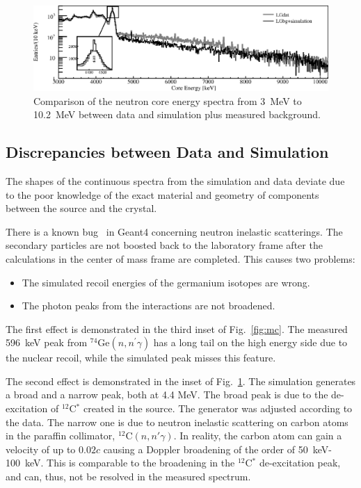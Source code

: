 \documentclass{elsart}
\begin{document}
\begin{figure}[tbhp]
  \centering
  \includegraphics[width=\textwidth,clip]{spectra_3_11MeVm.eps}
  \caption{Comparison of the neutron core energy spectra from 3~MeV to
    10.2~MeV between data and simulation plus measured background.}
  \label{fig:mcl}
\end{figure}

\subsection{Discrepancies between Data and Simulation}
\label{sec:dine}
The shapes of the continuous spectra from the simulation and data
deviate due to the poor knowledge of the exact material and geometry
of components between the source and the crystal.

There is a known bug~\cite{g4bug1} in Geant4 concerning neutron
inelastic scatterings. The secondary particles are not boosted back to
the laboratory frame after the calculations in the center of mass
frame are completed. This causes two problems:
\begin{itemize}
\item The simulated recoil energies of the germanium isotopes are
  wrong.
\item The photon peaks from the interactions are not broadened.
\end{itemize}

The first effect is demonstrated in the third inset of
Fig.~\ref{fig:mc}. The measured 596~keV peak from
$^{74}$Ge$(n,n^\prime\gamma)$ has a long tail on the high energy side
due to the nuclear recoil, while the simulated peak misses this
feature.

The second effect is demonstrated in the inset of
Fig.~\ref{fig:mcl}. The simulation generates a broad and a narrow
peak, both at 4.4 MeV. The broad peak is due to the de-excitation of
$^{12}$C$^{*}$ created in the source. The generator was adjusted
according to the data. The narrow one is due to neutron inelastic
scattering on carbon atoms in the paraffin collimator,
$^{12}$C$(n,n'\gamma)$. In reality, the carbon atom can gain a
velocity of up to $0.02c$ causing a Doppler broadening of the order of
50~keV-100~keV. This is comparable to the broadening in the
$^{12}$C$^{*}$ de-excitation peak, and can, thus, not be resolved in
the measured spectrum.
\end{document}
